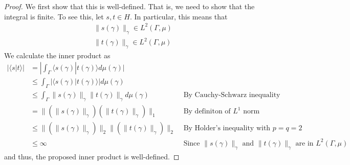 \documentclass[fontsize=11pt]{scrartcl} %
\numberwithin{equation}{section} %
\numberwithin{figure}{section} %
\numberwithin{table}{section} %
\newcommand{\la}{\langle}
\newcommand{\ra}{\rangle}
\begin{document}
\begin{proof}
    We first show that this is well-defined. That is, we need to show that the
    integral is finite. To see this, let $s,t\in H$. In particular, this means
    that
    \[
        \begin{aligned}
            \|s(\gamma)\|_{\gamma}\in L^2(\Gamma,\mu)\\
            \|t(\gamma)\|_{\gamma}\in L^2(\Gamma,\mu)
    \end{aligned}
    \]
    We calculate the inner product as
    \[
\begin{aligned}
    |\la s|t\ra| &= |\int_{\Gamma}\la s(\gamma)|t(\gamma)\ra d\mu(\gamma)|\\
    &\leq \int_{\Gamma}|\la s(\gamma)|t(\gamma)\ra| d\mu(\gamma)\\
    &\leq \int_{\Gamma}\|s(\gamma)\|_{\gamma}\|t(\gamma)\|_{\gamma}
    d\mu(\gamma)&\text{ By Cauchy-Schwarz inequality}\\
    &=\|\left(\|s(\gamma)\|_{\gamma}\right)\left(\|t(\gamma)\|_{\gamma}\right)\|_1
    &\text{ By definiton of $L^1$ norm}\\
    &\leq
    \|\left(\|s(\gamma)\|_{\gamma}\right)\|_2\|\left(\|t(\gamma)\|_{\gamma}\right)\|_2
    &\text{ By Holder's inequality with $p=q=2$}\\
    &\leq \infty &\text{ Since $\|s(\gamma)\|_{\gamma}$ and
    $\|t(\gamma)\|_{\gamma}$ are in $L^2(\Gamma,\mu)$}
\end{aligned}
    \]
    and thus, the proposed inner product is well-defined.


\end{proof}
\end{document}
